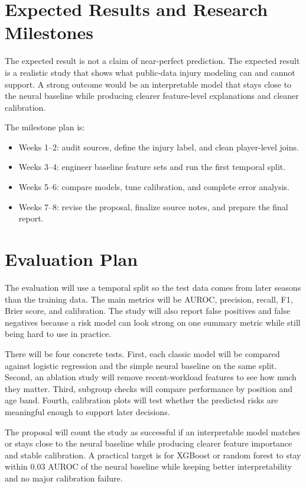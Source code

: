 \documentclass[11pt]{article}
\begin{document}
\section{Expected Results and Research Milestones}
The expected result is not a claim of near-perfect prediction. The expected result is a realistic study that shows what public-data injury modeling can and cannot support. A strong outcome would be an interpretable model that stays close to the neural baseline while producing clearer feature-level explanations and cleaner calibration.

The milestone plan is:
\begin{itemize}
\item Weeks 1--2: audit sources, define the injury label, and clean player-level joins.
\item Weeks 3--4: engineer baseline feature sets and run the first temporal split.
\item Weeks 5--6: compare models, tune calibration, and complete error analysis.
\item Weeks 7--8: revise the proposal, finalize source notes, and prepare the final report.
\end{itemize}

\section{Evaluation Plan}
The evaluation will use a temporal split so the test data comes from later seasons than the training data. The main metrics will be AUROC, precision, recall, F1, Brier score, and calibration. The study will also report false positives and false negatives because a risk model can look strong on one summary metric while still being hard to use in practice.

There will be four concrete tests. First, each classic model will be compared against logistic regression and the simple neural baseline on the same split. Second, an ablation study will remove recent-workload features to see how much they matter. Third, subgroup checks will compare performance by position and age band. Fourth, calibration plots will test whether the predicted risks are meaningful enough to support later decisions.

The proposal will count the study as successful if an interpretable model matches or stays close to the neural baseline while producing clearer feature importance and stable calibration. A practical target is for XGBoost or random forest to stay within 0.03 AUROC of the neural baseline while keeping better interpretability and no major calibration failure.
\end{document}
